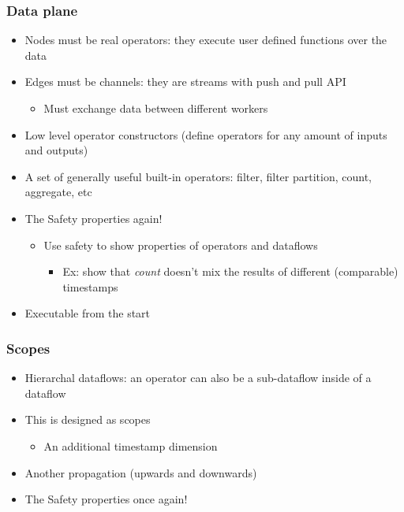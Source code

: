 \documentclass[aspectratio=169,10pt]{beamer}
\begin{document}
\begin{frame}
  \frametitle{Data plane}
  \begin{itemize}
    \item Nodes must be real operators: they execute user defined functions over the data
    \item Edges must be channels: they are streams with push and pull API
          \begin{itemize}
            \item Must exchange data between different workers
          \end{itemize}
    \item Low level operator constructors (define operators for any amount of inputs and outputs)
    \item A set of generally useful built-in operators: filter, filter partition, count, aggregate, etc
    \item The Safety properties again!
          \begin{itemize}
            \item Use safety to show properties of operators and dataflows
                  \begin{itemize}
                          \item Ex: show that \textit{count} doesn't mix the results of different (comparable) timestamps
                  \end{itemize}
          \end{itemize}
    \item Executable from the start
  \end{itemize}
\end{frame}

\begin{frame}
  \frametitle{Scopes}
  \begin{itemize}
    \item Hierarchal dataflows: an operator can also be a sub-dataflow inside of a dataflow
    \item This is designed as scopes
          \begin{itemize}
            \item An additional timestamp dimension
          \end{itemize}
    \item Another propagation (upwards and downwards)
    \item The Safety properties once again!
  \end{itemize}
\end{frame}
\end{document}
